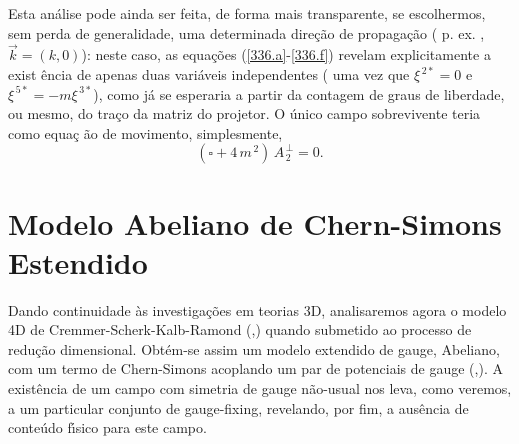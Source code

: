 \documentclass[a4paper,thmsa,12pt]{report}
\begin{document}
Esta an\'{a}lise  pode ainda ser feita, de forma mais transparente, se
escolhermos, sem perda de generalidade, uma determinada dire\c{c}\~{a}o de
propaga\c{c}\~{a}o ( p. ex. , $\vec{k}=\left( k,0\right) $): neste caso, as
equa\c{c}\~{o}es (\ref{336.a}-\ref{336.f}) revelam explicitamente a exist%
\^{e}ncia de apenas duas vari\'{a}veis independentes ( uma vez que $\xi
^{\,2\ast }=0$ e $\xi ^{\,5\ast }=-m\xi ^{\,3\ast }$), como j\'{a} se
esperaria a partir da contagem de graus de liberdade, ou mesmo, do tra\c{c}o
da matriz do projetor. O \'{u}nico campo sobrevivente teria como equa\c{c}%
\~{a}o de movimento, simplesmente, 
\begin{equation}
\left( \square +4\,m^{\,2}\right) \,A_{\,2}^{\,\perp }=0.  \label{343}
\end{equation}

\section{\sc Modelo Abeliano de Chern-Simons Estendido}

Dando continuidade \`{a}s investiga\c{c}\~{o}es em teorias 3D, analisaremos
agora o modelo 4D de Cremmer-Scherk-Kalb-Ramond (\cite{kr},\cite{cs}) quando
submetido ao processo de redu\c{c}\~{a}o dimensional. Obt\'{e}m-se assim um
modelo extendido de gauge, Abeliano, com um termo de Chern-Simons acoplando
um par de potenciais de gauge (\cite{cchmn1},\cite{cchmn2}). A
exist\^{e}ncia de um campo com simetria de gauge n\~{a}o-usual nos leva,
como veremos, a um particular conjunto de gauge-fixing, revelando, por fim,
a aus\^{e}ncia de conte\'{u}do f\'{\i}sico para este campo\cite{alvaro}.
\end{document}
